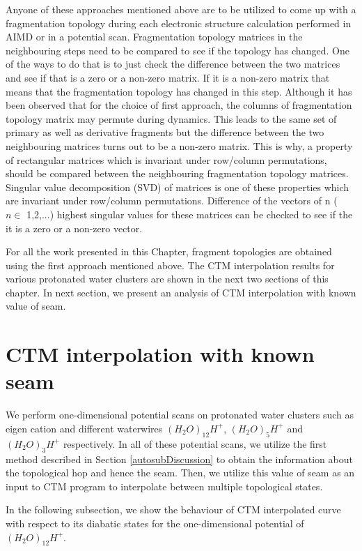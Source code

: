 Anyone of these approaches mentioned above are to be utilized to come up with a
fragmentation topology during each electronic structure calculation performed in
AIMD or in a potential scan. Fragmentation topology matrices in the neighbouring
steps need to be compared to see if the topology has changed. One of the ways to
do that is to just check the difference between the two matrices and see if that
is a zero or a non-zero matrix. If it is a non-zero matrix that means that the
fragmentation topology has changed in this step. Although it has been observed
that for the choice of first approach, the columns of fragmentation topology
matrix may permute during dynamics. This leads to the same set of primary as
well as derivative fragments but the difference between the two neighbouring
matrices turns out to be a non-zero matrix. This is why, a property of rectangular
matrices which is invariant under row/column permutations, should be compared
between the neighbouring fragmentation topology matrices. Singular value
decomposition (SVD) of matrices is one of these properties which are invariant
under row/column permutations. Difference of the vectors of n ( $n \in$ {1,2,...}) highest
singular values for these matrices can be checked to see if the it is a zero or
a non-zero vector.
\newcommand{\N}{\mathbb{N}}

For all the work presented in this Chapter, fragment topologies are obtained
using the first approach mentioned above. The CTM interpolation results for various
protonated water clusters are shown in the next two sections of this chapter.
In next section, we present an analysis of CTM interpolation with known value of
seam.

\section{CTM interpolation with known seam}
We perform one-dimensional potential scans on protonated water clusters such as eigen
cation and different waterwires $(H_{2}O)_{12}H^+$, $(H_{2}O)_{5}H^+$ and
$(H_{2}O)_{3}H^+$ respectively. In all of these potential scans, we utilize the
first method described in Section \ref{autosubDiscussion} to obtain the information
about the topological hop and hence the seam. Then, we utilize this value of seam as
an input to CTM program to interpolate between multiple topological states.

In the following subsection, we show the behaviour of CTM interpolated curve with
respect to its diabatic states for the one-dimensional potential of $(H_{2}O)_{12}H^+$.

